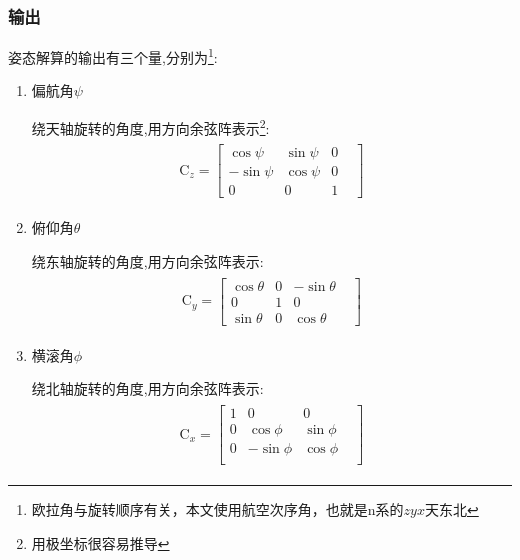 \documentclass[12pt,a4paper]{article}
\renewcommand{\citep}[1]{\textsuperscript{\cite{#1}}}
\begin{document}
\subsubsection{输出}
姿态解算的输出有三个量,分别为\footnote{欧拉角与旋转顺序有关，本文使用航空次序角，也就是n系的$zyx$天东北}:
\begin{enumerate}
    \item 偏航角$\psi$

        绕天轴旋转的角度,用方向余弦阵表示\footnote{用极坐标很容易推导\citep{二维旋转}}: 
        \begin{eqnarray}\label{偏航角方向余弦}
            \begin{split}
                \mathrm{C}_z=\left[\begin{matrix}
                         \cos{\psi} & \sin{\psi} & 0 & \\
                        -\sin{\psi} & \cos{\psi} & 0 & \\
                                 0 &          0 & 1 &
                \end{matrix}\right]
            \end{split}
        \end{eqnarray}
    \item 俯仰角$\theta$

        绕东轴旋转的角度,用方向余弦阵表示: 
        \begin{eqnarray}\label{俯仰角方向余弦}
            \begin{split}
                \mathrm{C}_y=\left[\begin{matrix}
                        \cos{\theta} & 0 & -\sin{\theta} & \\
                                   0 & 1 &           0 & \\
                        \sin{\theta} & 0 &  \cos{\theta} &
                \end{matrix}\right]
            \end{split}
        \end{eqnarray}
    \item 横滚角$\phi$

        绕北轴旋转的角度,用方向余弦阵表示: 
        \begin{eqnarray}\label{横滚角方向余弦}
            \begin{split}
                \mathrm{C}_x=\left[\begin{matrix}
                        1 &           0 &          0 & \\
                        0 &  \cos{\phi} & \sin{\phi} & \\
                        0 & -\sin{\phi} & \cos{\phi} & \\
                \end{matrix}\right]
            \end{split}
        \end{eqnarray}
\end{enumerate}
\end{document}
